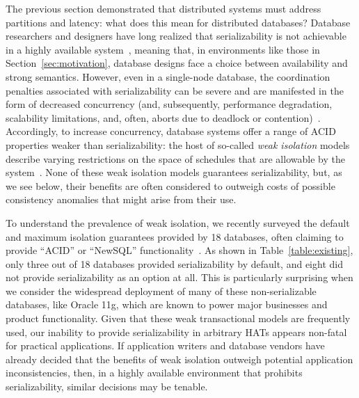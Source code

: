 The previous section demonstrated that distributed systems must
address partitions and latency: what does this mean for distributed
databases? Database researchers and designers have long realized that
serializability is not achievable in a highly available
system~\cite{davidson-survey}, meaning that, in environments like
those in Section~\ref{sec:motivation}, database designs face a choice
between availability and strong semantics. However, even in a
single-node database, the coordination penalties associated with
serializability can be severe and are manifested in the form of
decreased concurrency (and, subsequently, performance degradation,
scalability limitations, and, often, aborts due to deadlock or
contention)~\cite{gray-isolation}. Accordingly, to increase
concurrency, database systems offer a range of ACID properties weaker
than serializability: the host of so-called \textit{weak isolation}
models describe varying restrictions on the space of schedules that
are allowable by the system~\cite{adya, ansi-sql, ansicritique}. None
of these weak isolation models guarantees serializability, but, as we
see below, their benefits are often considered to outweigh costs of
possible consistency anomalies that might arise from their use.

To understand the prevalence of weak isolation, we
recently surveyed the default and maximum isolation guarantees provided by
18 databases, often claiming to provide ``ACID'' or ``NewSQL''
functionality~\cite{hat-hotos}. As shown in
Table~\ref{table:existing}, only three out of 18 databases provided
serializability by default, and eight did not provide serializability
as an option at all. This is particularly surprising when we consider
the widespread deployment of many of these non-serializable databases,
like Oracle 11g, which are known to power major businesses and product
functionality. Given that these weak transactional models are frequently
used, our inability to provide serializability in arbitrary HATs
appears non-fatal for practical applications. If application writers
and database vendors have already decided that the benefits of weak
isolation outweigh potential application inconsistencies, then, in a
highly available environment that prohibits serializability, similar
decisions may be tenable.

